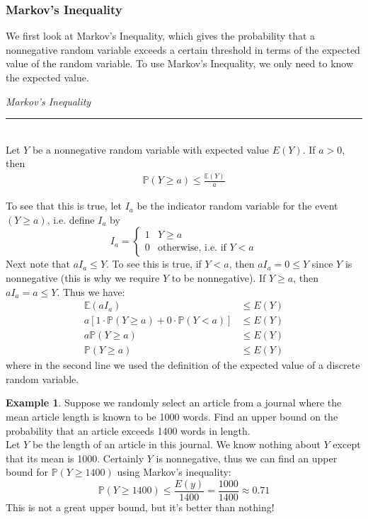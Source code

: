 \documentclass[12pt]{article}
\theoremstyle{definition}
\newtheorem*{example}{Example}
\theoremstyle{remark}
\def\P{{\mathbb P}}
\def\E{{\mathbb E}}
\begin{document}
\subsubsection{Markov's Inequality}
We first look at Markov's Inequality, which gives the probability that a nonnegative random variable exceeds a certain threshold in terms of the expected value of the random variable. To use Markov's Inequality, we only need to know the expected value.

\begin{framed}
\emph{Markov's Inequality}\\
  \rule{\dimexpr{}\fboxrule}{.1pt} \\
Let $Y$ be a nonnegative random variable with expected value $E(Y)$. If $a > 0$, then
\begin{align*}
\P(Y \geq a) \leq \frac{\E(Y)}{a}
\end{align*}
\end{framed} 
To see that this is true, let $I_a$ be the indicator random variable for the event $(Y \geq a)$, i.e. define $I_a$
 by
 \[
I_a = \begin{cases}
1 & Y \geq a \\
0 & \text{otherwise, i.e. if }Y < a
\end{cases}
\]
Next note that $a I_a \leq Y$. To see this is true, if $Y < a$, then $a I_a = 0 \leq Y$ since $Y$ is nonnegative (this is why we require $Y$ to be nonnegative). If $Y \geq a$, then $a I_a = a \leq Y$. Thus we have:
\begin{align*}
\E(a I_a) &\leq E(Y) \\
a\left[ 1 \cdot \P(Y \geq a) + 0 \cdot \P(Y < a) \right] &\leq E(Y) \\
a \P(Y \geq a) &\leq E(Y) \\
\P(Y \geq a) &\leq E(Y)
\end{align*}
where in the second line we used the definition of the expected value of a discrete random variable.

\begin{example}Suppose we randomly select an article from a journal where the mean article length is known to be 1000 words. Find an upper bound on the probability that an article exceeds 1400 words in length.\\

Let $Y$ be the length of an article in this journal. We know nothing about $Y$ except that its mean is 1000. Certainly $Y$ is nonnegative, thus we can find an upper bound for $\P(Y \geq 1400)$ using Markov's inequality:
\[
\P(Y \geq 1400) \leq \frac{E(y)}{1400} = \frac{1000}{1400} \approx 0.71
\]
This is not a great upper bound, but it's better than nothing!
\end{example}
\end{document}
